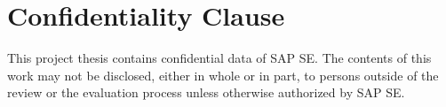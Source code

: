 \chapter*{Confidentiality Clause}\noindent This project thesis contains confidential data of SAP SE. The contents of this work may not
be disclosed, either in whole or in part, to persons outside of the review or the evaluation
process unless otherwise authorized by SAP SE.


\cleardoublepage
